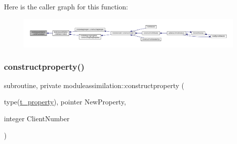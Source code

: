 Here is the caller graph for this function\+:\nopagebreak
\begin{figure}[H]
\begin{center}
\leavevmode
\includegraphics[width=350pt]{namespacemoduleassimilation_a0290dba29cfc2f2e50954134308fdd93_icgraph}
\end{center}
\end{figure}
\mbox{\label{namespacemoduleassimilation_af8bbe3b809fb38aac25e711c6dc7dc2e}} 
\subsubsection{\texorpdfstring{constructproperty()}{constructproperty()}}
{\footnotesize\ttfamily subroutine, private moduleassimilation\+::constructproperty (\begin{DoxyParamCaption}\item[{type(\mbox{\hyperlink{structmoduleassimilation_1_1t__property}{t\+\_\+property}}), pointer}]{New\+Property,  }\item[{integer}]{Client\+Number }\end{DoxyParamCaption})\hspace{0.3cm}{\ttfamily [private]}}

